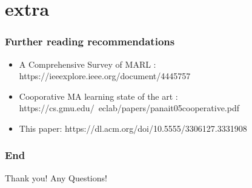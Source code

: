 \documentclass{beamer}
\begin{document}
	\section{extra}
	\begin{frame}
	\frametitle{Further reading recommendations}
		\begin{itemize}
			\item A Comprehensive Survey of MARL : https://ieeexplore.ieee.org/document/4445757
			\item Cooporative MA learning state of the art : https://cs.gmu.edu/~eclab/papers/panait05cooperative.pdf
			\item This paper: https://dl.acm.org/doi/10.5555/3306127.3331908
		\end{itemize}
	\end{frame}
	\begin{frame}
	\frametitle{End}
	Thank you!
	Any Questions!
	\end{frame}
\end{document}
